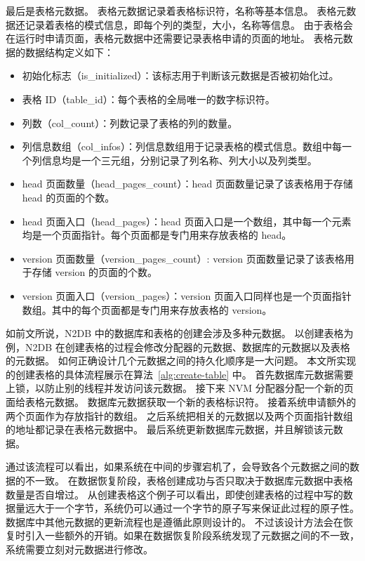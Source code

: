 最后是表格元数据。
表格元数据记录着表格标识符，名称等基本信息。
表格元数据还记录着表格的模式信息，即每个列的类型，大小，名称等信息。
由于表格会在运行时申请页面，表格元数据中还需要记录表格申请的页面的地址。
表格元数据的数据结构定义如下：
\begin{itemize}
    \item 初始化标志（is\_initialized）：该标志用于判断该元数据是否被初始化过。
    \item 表格 ID（table\_id）：每个表格的全局唯一的数字标识符。
    \item 列数（col\_count）：列数记录了表格的列的数量。
    \item 列信息数组（col\_infos）：列信息数组用于记录表格的模式信息。数组中每一个列信息均是一个三元组，分别记录了列名称、列大小以及列类型。
    \item head 页面数量（head\_pages\_count）：head 页面数量记录了该表格用于存储 head 的页面的个数。
    \item head 页面入口（head\_pages）：head 页面入口是一个数组，其中每一个元素均是一个页面指针。每个页面都是专门用来存放表格的 head。
    \item version 页面数量（version\_pages\_count）: version 页面数量记录了该表格用于存储 version 的页面的个数。
    \item version 页面入口（version\_pages）：version 页面入口同样也是一个页面指针数组。其中的每个页面都是专门用来存放表格的 version。
\end{itemize}


如前文所说，N2DB 中的数据库和表格的创建会涉及多种元数据。
以创建表格为例，N2DB 在创建表格的过程会修改分配器的元数据、数据库的元数据以及表格的元数据。
如何正确设计几个元数据之间的持久化顺序是一大问题。
本文所实现的创建表格的具体流程展示在算法~\ref{alg:create-table} 中。
首先数据库元数据需要上锁，以防止别的线程并发访问该元数据。
接下来 NVM 分配器分配一个新的页面给表格元数据。
数据库元数据获取一个新的表格标识符。
接着系统申请额外的两个页面作为存放指针的数组。
之后系统把相关的元数据以及两个页面指针数组的地址都记录在表格元数据中。
最后系统更新数据库元数据，并且解锁该元数据。

通过该流程可以看出，如果系统在中间的步骤宕机了，会导致各个元数据之间的数据的不一致。
在数据恢复阶段，表格创建成功与否只取决于数据库元数据中表格数量是否自增过。
从创建表格这个例子可以看出，即使创建表格的过程中写的数据量远大于一个字节，系统仍可以通过一个字节的原子写来保证此过程的原子性。数据库中其他元数据的更新流程也是遵循此原则设计的。
不过该设计方法会在恢复时引入一些额外的开销。如果在数据恢复阶段系统发现了元数据之间的不一致，系统需要立刻对元数据进行修改。

